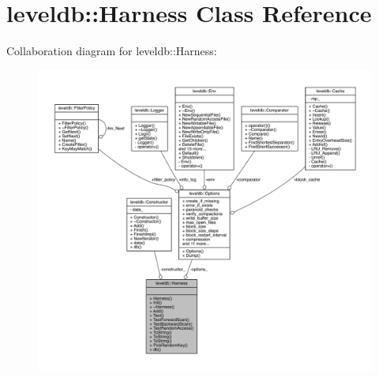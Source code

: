 \hypertarget{classleveldb_1_1_harness}{}\section{leveldb\+:\+:Harness Class Reference}
\label{classleveldb_1_1_harness}


Collaboration diagram for leveldb\+:\+:Harness\+:
\nopagebreak
\begin{figure}[H]
\begin{center}
\leavevmode
\includegraphics[width=350pt]{classleveldb_1_1_harness__coll__graph}
\end{center}
\end{figure}
